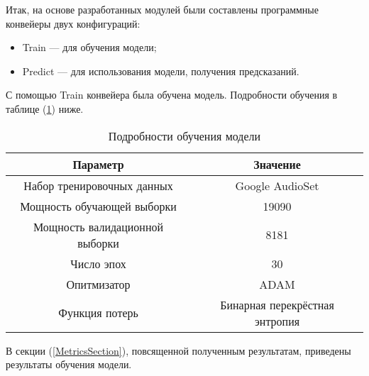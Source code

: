 \documentclass[../body.tex]{subfiles}
\begin{document}
Итак, на основе разработанных модулей были составлены программные конвейеры двух конфигураций:

\begin{itemize}
	\item Train --- для обучения модели;
	\item Predict --- для использования модели, получения предсказаний.
\end{itemize}

С помощью Train конвейера была обучена модель. Подробности обучения в таблице (\ref{FitParamsTable}) ниже.

\begin{table}[H]
	\centering
	\begin{tabular}{|c|c|}
		\hline
		Параметр & Значение \\
		\hline
		Набор тренировочных данных & Google AudioSet \cite{audioset} \\
		\hline
		Мощность обучающей выборки & 19090 \\
		\hline
		Мощность валидационной выборки & 8181 \\
		\hline
		Число эпох & 30 \\
		\hline
		Опитмизатор & ADAM \cite{adam_optimizer} \\
		\hline
		Функция потерь & Бинарная перекрёстная энтропия \cite{wiki:bin_crossentropy} \\
		\hline
	\end{tabular}
	\caption{Подробности обучения модели}\label{FitParamsTable}
\end{table}

В секции (\ref{MetricsSection}), повсященной полученным результатам,  приведены результаты обучения модели.
\end{document}
